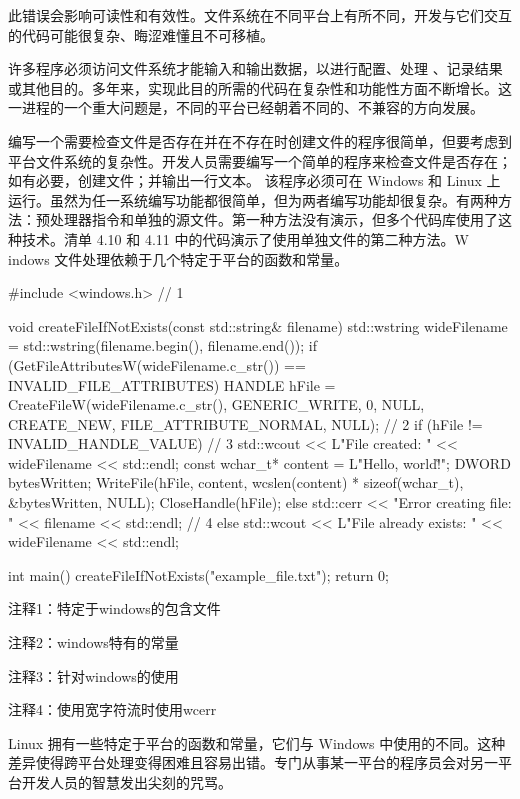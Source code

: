 此错误会影响可读性和有效性。文件系统在不同平台上有所不同，开发与它们交互的代码可能很复杂、晦涩难懂且不可移植。


许多程序必须访问文件系统才能输入和输出数据，以进行配置、处理 、记录结果或其他目的。多年来，实现此目的所需的代码在复杂性和功能性方面不断增长。这一进程的一个重大问题是，不同的平台已经朝着不同的、不兼容的方向发展。

编写一个需要检查文件是否存在并在不存在时创建文件的程序很简单，但要考虑到平台文件系统的复杂性。开发人员需要编写一个简单的程序来检查文件是否存在；如有必要，创建文件；并输出一行文本。
该程序必须可在 Windows 和 Linux 上运行。虽然为任一系统编写功能都很简单，但为两者编写功能却很复杂。有两种方法：预处理器指令和单独的源文件。第一种方法没有演示，但多个代码库使用了这种技术。清单 4.10 和 4.11 中的代码演示了使用单独文件的第二种方法。W indows 文件处理依赖于几个特定于平台的函数和常量。


\begin{cpp}
#include <windows.h> // 1

void createFileIfNotExists(const std::string& filename) {
  std::wstring wideFilename = std::wstring(filename.begin(), filename.end());
  if (GetFileAttributesW(wideFilename.c_str()) == INVALID_FILE_ATTRIBUTES) {
    HANDLE hFile = CreateFileW(wideFilename.c_str(), GENERIC_WRITE, 0,
    NULL, CREATE_NEW,
    FILE_ATTRIBUTE_NORMAL, NULL); // 2
    if (hFile != INVALID_HANDLE_VALUE) { // 3
      std::wcout << L"File created: " << wideFilename << std::endl;
      const wchar_t* content = L"Hello, world!\r\n";
      DWORD bytesWritten;
      WriteFile(hFile, content, wcslen(content) * sizeof(wchar_t),
      &bytesWritten, NULL);
      CloseHandle(hFile);
    } else
      std::cerr << "Error creating file: " << filename << std::endl; // 4
    } else
      std::wcout << L"File already exists: " << wideFilename << std::endl;
}

int main() {
  createFileIfNotExists("example_file.txt");
  return 0;
}
\end{cpp}

{\footnotesize
注释1：特定于windows的包含文件

注释2：windows特有的常量

注释3：针对windows的使用

注释4：使用宽字符流时使用wcerr
}

Linux 拥有一些特定于平台的函数和常量，它们与 Windows 中使用的不同。这种差异使得跨平台处理变得困难且容易出错。专门从事某一平台的程序员会对另一平台开发人员的智慧发出尖刻的咒骂。

